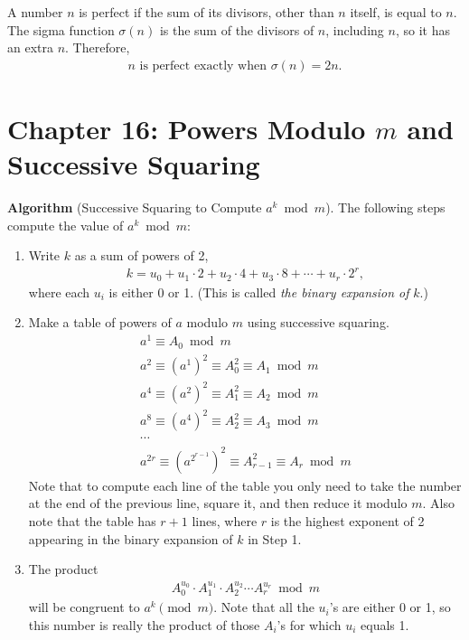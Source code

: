 \documentclass[graybox]{svmult}
\begin{document}
A number $n$ is perfect if the sum of its divisors, other than $n$ itself, is equal to $n$. The sigma function $\sigma(n)$ is the sum of the divisors of $n$, including $n$, so it has an extra $n$. Therefore,
\begin{align*}
n \text{ is perfect exactly when } \sigma(n) = 2n.
\end{align*}

\section*{Chapter 16: Powers Modulo $m$ and Successive Squaring}

\textbf{Algorithm }(Successive Squaring to Compute $a^k \bmod m$). The following steps compute the value of $a^k \bmod m$:
\begin{enumerate}
\item Write $k$ as a sum of powers of 2,
\begin{align*}
k = u_0 + u_1 \cdot 2 + u_2 \cdot 4 + u_3 \cdot 8 + \cdots + u_r \cdot 2^r,
\end{align*}
where each $u_i$ is either 0 or 1. (This is called \textit{the binary expansion of} $k$.)
\item Make a table of powers of $a$ modulo $m$ using successive squaring.
\begin{align*}
a^1 \equiv A_0 \bmod m\\
a^2 \equiv (a^1)^2 \equiv A_0^2 \equiv A_1 \bmod m\\
a^4 \equiv (a^2)^2 \equiv A_1^2 \equiv A_2 \bmod m\\
a^8 \equiv (a^4)^2 \equiv A_2^2 \equiv A_3 \bmod m\\
\cdots\\
a^{2r} \equiv \left(a^{2^{r-1}}\right)^2\equiv A_{r-1}^2 \equiv A_r \bmod m
\end{align*}
Note that to compute each line of the table you only need to take the number at the end of the previous line, square it, and then reduce it modulo $m$. Also note that the table has $r+1$ lines, where $r$ is the highest exponent of 2 appearing in the binary expansion of $k$ in Step 1.
\item The product
\begin{align*}
A_0^{u_0}\cdot A_1^{u_1} \cdot A_2^{u_2} \cdots A_r^{u_r} \bmod m
\end{align*}
will be congruent to $a^k \pmod m$. Note that all the $u_i$'s are either 0 or 1, so this number is really the product of those $A_i$'s for which $u_i$ equals 1.
\end{enumerate}
\end{document}
